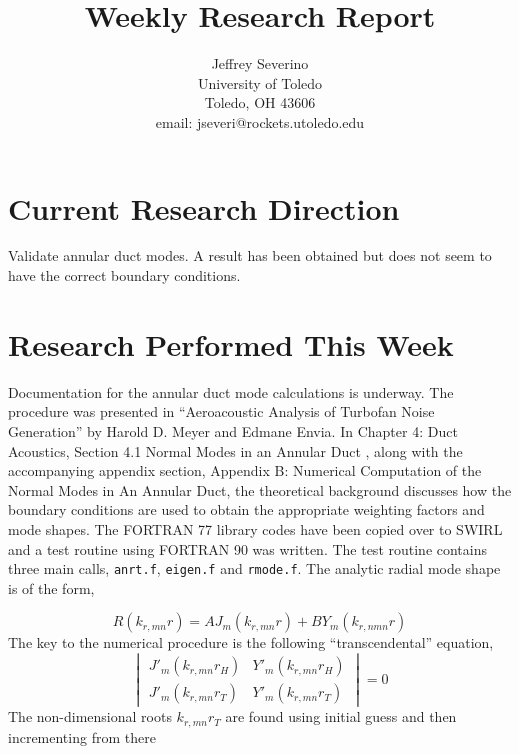 \documentclass[a4paper]{article}
\begin{document}
\begin{titlepage}

    \title{
    Weekly Research Report}


    \author{ Jeffrey Severino \\
        University of Toledo \\
        Toledo, OH  43606 \\
    email: jseveri@rockets.utoledo.edu}


    \maketitle

\end{titlepage}
\section{Current Research Direction}
Validate annular duct modes. A result has been obtained but does not seem to 
have the correct boundary conditions.

\section{Research Performed This Week}
Documentation for the annular duct mode calculations is underway. The procedure
was presented in ``Aeroacoustic Analysis of Turbofan Noise Generation'' by 
Harold D. Meyer and Edmane Envia. In Chapter 4: Duct Acoustics, Section 
4.1 Normal Modes in an Annular Duct , along with the accompanying appendix 
section, Appendix B: Numerical Computation of the Normal Modes in An Annular 
Duct, the theoretical background discusses how the boundary conditions are
used to obtain the appropriate weighting factors and mode shapes. The FORTRAN 77
library codes have been copied over to SWIRL and a test routine using 
FORTRAN 90 was written. The test routine contains three main calls, \verb|anrt.f|,
\verb|eigen.f| and \verb|rmode.f|. 
The analytic radial mode shape is of the form,

\begin{equation}
    R(k_{r,mn} r) =  A J_m (k_{r,mn} r) + B Y_m (k_{r,nmn} r)
\end{equation}
The key to the numerical procedure is the following ``transcendental'' equation,
\begin{equation}
    \begin{vmatrix}
        J'_m(k_{r,mn} r_H) &Y'_m(k_{r,mn} r_H) \\
        J'_m(k_{r,mn} r_T) &Y'_m(k_{r,mn} r_T) 
    \end{vmatrix}   
    = 0
\end{equation}
 The non-dimensional roots $k_{r,mn} r_T$ are found using initial guess and then incrementing from there
\end{document}
